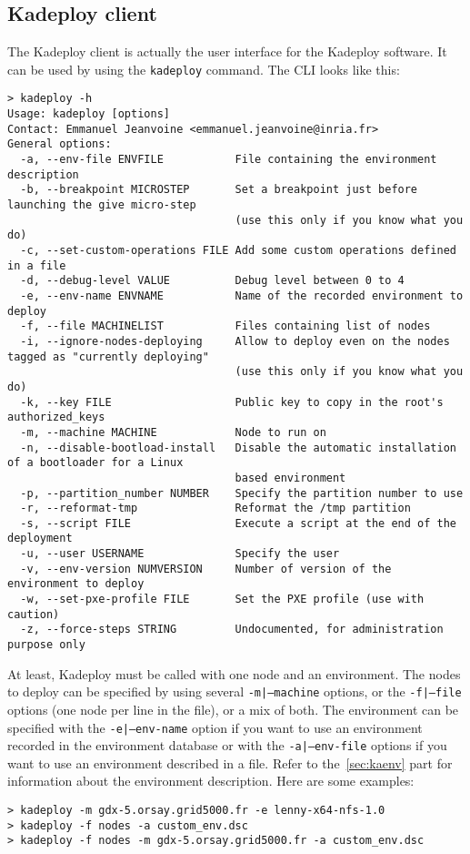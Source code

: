 \documentclass[a4wide,10pt,oneside]{book}
\begin{document}
\subsection{Kadeploy client}
The Kadeploy client is actually the user interface for the Kadeploy software. It can be used by using the \texttt{kadeploy} command. The CLI looks like this:
\begin{small}
\begin{verbatim}
> kadeploy -h
Usage: kadeploy [options]
Contact: Emmanuel Jeanvoine <emmanuel.jeanvoine@inria.fr>
General options:
  -a, --env-file ENVFILE           File containing the environment description
  -b, --breakpoint MICROSTEP       Set a breakpoint just before launching the give micro-step 
                                   (use this only if you know what you do)
  -c, --set-custom-operations FILE Add some custom operations defined in a file
  -d, --debug-level VALUE          Debug level between 0 to 4
  -e, --env-name ENVNAME           Name of the recorded environment to deploy
  -f, --file MACHINELIST           Files containing list of nodes
  -i, --ignore-nodes-deploying     Allow to deploy even on the nodes tagged as "currently deploying"
                                   (use this only if you know what you do)
  -k, --key FILE                   Public key to copy in the root's authorized_keys
  -m, --machine MACHINE            Node to run on
  -n, --disable-bootload-install   Disable the automatic installation of a bootloader for a Linux
                                   based environment
  -p, --partition_number NUMBER    Specify the partition number to use
  -r, --reformat-tmp               Reformat the /tmp partition
  -s, --script FILE                Execute a script at the end of the deployment
  -u, --user USERNAME              Specify the user
  -v, --env-version NUMVERSION     Number of version of the environment to deploy
  -w, --set-pxe-profile FILE       Set the PXE profile (use with caution)
  -z, --force-steps STRING         Undocumented, for administration purpose only
\end{verbatim}
\end{small}

At least, Kadeploy must be called with one node and an environment. The nodes to deploy can be specified by using several \texttt{-m|--machine} options, or the \texttt{-f|--file} options (one node per line in the file), or a mix of both.
The environment can be specified with the \texttt{-e|--env-name} option if you want to use an environment recorded in the environment database or with the \texttt{-a|--env-file} options if you want to use an environment described in a file. Refer to the~\ref{sec:kaenv} part for information about the environment description. Here are some examples:
\begin{verbatim}
> kadeploy -m gdx-5.orsay.grid5000.fr -e lenny-x64-nfs-1.0
> kadeploy -f nodes -a custom_env.dsc
> kadeploy -f nodes -m gdx-5.orsay.grid5000.fr -a custom_env.dsc
\end{verbatim}
\end{document}
